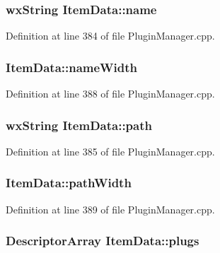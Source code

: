\subsubsection[{\texorpdfstring{name}{name}}]{\setlength{\rightskip}{0pt plus 5cm}wx\+String Item\+Data\+::name}\hypertarget{struct_item_data_a2606dd42bcb9cf78f5cb8b469d295f2b}{}\label{struct_item_data_a2606dd42bcb9cf78f5cb8b469d295f2b}


Definition at line 384 of file Plugin\+Manager.\+cpp.

\subsubsection[{\texorpdfstring{name\+Width}{nameWidth}}]{ Item\+Data\+::name\+Width}\hypertarget{struct_item_data_a941d57ae5e22297c9dd27f199c33b4fc}{}\label{struct_item_data_a941d57ae5e22297c9dd27f199c33b4fc}


Definition at line 388 of file Plugin\+Manager.\+cpp.

\subsubsection[{\texorpdfstring{path}{path}}]{\setlength{\rightskip}{0pt plus 5cm}wx\+String Item\+Data\+::path}\hypertarget{struct_item_data_a23074d8b0bcba5a6f8c156aaaec8c914}{}\label{struct_item_data_a23074d8b0bcba5a6f8c156aaaec8c914}


Definition at line 385 of file Plugin\+Manager.\+cpp.

\subsubsection[{\texorpdfstring{path\+Width}{pathWidth}}]{ Item\+Data\+::path\+Width}\hypertarget{struct_item_data_a30c61ff015ef3f762645063d9db149b5}{}\label{struct_item_data_a30c61ff015ef3f762645063d9db149b5}


Definition at line 389 of file Plugin\+Manager.\+cpp.

\subsubsection[{\texorpdfstring{plugs}{plugs}}]{\setlength{\rightskip}{0pt plus 5cm}Descriptor\+Array Item\+Data\+::plugs}\hypertarget{struct_item_data_af6455fda366e14e56a32fa29740ed993}{}\label{struct_item_data_af6455fda366e14e56a32fa29740ed993}


